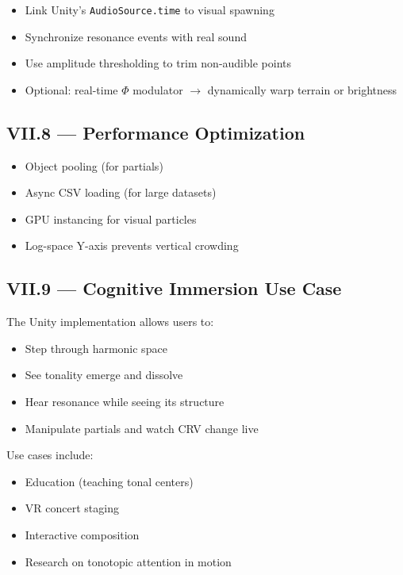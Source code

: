 \begin{itemize}
    \item Link Unity’s \texttt{AudioSource.time} to visual spawning
    \item Synchronize resonance events with real sound
    \item Use amplitude thresholding to trim non-audible points
    \item Optional: real-time $\Phi$ modulator $\rightarrow$ dynamically warp terrain or brightness
\end{itemize}

\subsection*{VII.8 — Performance Optimization}

\begin{itemize}
    \item Object pooling (for partials)
    \item Async CSV loading (for large datasets)
    \item GPU instancing for visual particles
    \item Log-space Y-axis prevents vertical crowding
\end{itemize}

\subsection*{VII.9 — Cognitive Immersion Use Case}

The Unity implementation allows users to:

\begin{itemize}
    \item Step through harmonic space
    \item See tonality emerge and dissolve
    \item Hear resonance while seeing its structure
    \item Manipulate partials and watch CRV change live
\end{itemize}

Use cases include:

\begin{itemize}
    \item Education (teaching tonal centers)
    \item VR concert staging
    \item Interactive composition
    \item Research on tonotopic attention in motion
\end{itemize}

